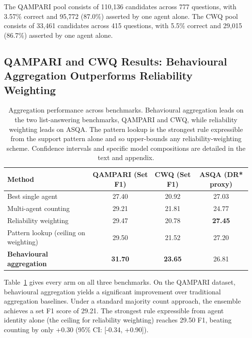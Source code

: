\documentclass[11pt]{article}
\begin{document}
The QAMPARI pool consists of 110,136 candidates across 777 questions, with 3.57\% correct and 95,772 (87.0\%) asserted by one agent alone. The CWQ pool consists of 33,461 candidates across 415 questions, with 5.5\% correct and 29,015 (86.7\%) asserted by one agent alone.

\subsection{QAMPARI and CWQ Results: Behavioural Aggregation Outperforms Reliability Weighting}
\label{sec:rq1}

\begin{table}[t]
\centering
\caption{Aggregation performance across benchmarks. Behavioural aggregation leads on the two list-answering benchmarks, QAMPARI and CWQ, while reliability weighting leads on ASQA. The pattern lookup is the strongest rule expressible from the support pattern alone and so upper-bounds any reliability-weighting scheme. Confidence intervals and specific model compositions are detailed in the text and appendix.}
\label{tab:main}
\begin{tabular}{lccc}
\toprule
\textbf{Method} & \textbf{QAMPARI (Set F1)} & \textbf{CWQ (Set F1)} & \textbf{ASQA (DR* proxy)} \\
\midrule
Best single agent & 27.40 & 20.92 & 27.03 \\
Multi-agent counting & 29.21 & 21.81 & 24.77 \\
Reliability weighting & 29.47 & 20.78 & \textbf{27.45} \\
Pattern lookup (ceiling on weighting) & 29.50 & 21.52 & 27.20 \\
\textbf{Behavioural aggregation} & \textbf{31.70} & \textbf{23.65} & 26.81 \\
\bottomrule
\end{tabular}
\end{table}


Table~\ref{tab:main} gives every arm on all three benchmarks. On the QAMPARI dataset, behavioural aggregation yields a significant improvement over traditional aggregation baselines. Under a standard majority count approach, the ensemble achieves a set F1 score of 29.21. The strongest rule expressible from agent identity alone (the ceiling for reliability weighting) reaches 29.50 F1, beating counting by only +0.30 (95\% CI: [-0.34, +0.90]).
\end{document}
